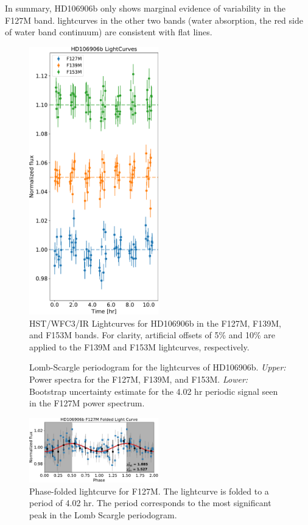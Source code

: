 \documentclass[twocolumn]{aastex62}
\begin{document}
In summary, HD106906b only shows marginal  evidence of variability in the F127M band. lightcurves in the other two bands (water absorption, the red side of water band continuum) are consistent with flat lines.

\begin{figure}
  \centering
  \includegraphics[width=0.5\textwidth]{figures/HD106906_lightcurves.pdf}
  \caption{HST/WFC3/IR Lightcurves for HD106906b in the F127M, F139M, and F153M bands. For clarity, artificial offsets of 5\% and 10\% are applied to the F139M and F153M lightcurves, respectively.}
  \label{fig:lightcurve}
\end{figure}

\begin{figure}
  \centering
  \caption{Lomb-Scargle periodogram for the lightcurves of HD106906b. \emph{Upper:} Power spectra for the F127M, F139M, and F153M. \emph{Lower:} Bootstrap uncertainty estimate for the 4.02 hr periodic signal seen in the F127M power spectrum. }
  \label{fig:periodogram}
\end{figure}

\begin{figure}
  \centering
  \includegraphics[width=0.5\textwidth]{figures/F127M_foldedLC.pdf}
  \caption{Phase-folded lightcurve for F127M. The lightcurve is folded to a period of 4.02 hr. The period corresponds to the most significant peak in the Lomb Scargle periodogram.}
  \label{fig:fold}
\end{figure}
\end{document}
